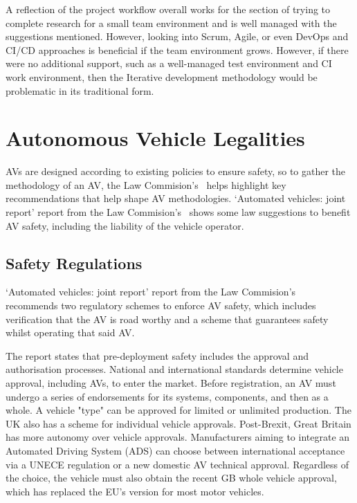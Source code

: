 \documentclass[12pt]{report} %
\begin{document}
		A reflection of the project workflow overall works for the section of trying to complete research for a small team environment and is well managed with the suggestions mentioned. However, looking into Scrum, Agile, or even DevOps and CI/CD approaches is beneficial if the team environment grows. However, if there were no additional support, such as a well-managed test environment and CI work environment, then the Iterative development methodology would be problematic in its traditional form.

\chapter{Autonomous Vehicle Legalities}
\label{chap:avLegalities}
	AVs are designed according to existing policies to ensure safety, so to gather the methodology of an AV, the Law Commision's~\cite{govuk_automated_2022} helps highlight key recommendations that help shape AV methodologies. `Automated vehicles: joint report' report from the Law Commision's~\cite{govuk_automated_2022} shows some law suggestions to benefit AV safety, including the liability of the vehicle operator.

		\section{Safety Regulations}
			`Automated vehicles: joint report' report from the Law Commision's~\cite{govuk_automated_2022} recommends two regulatory schemes to enforce AV safety, which includes verification that the AV is road worthy and a scheme that guarantees safety whilst operating that said AV.

			The report states that {pre-deployment} safety includes the approval and authorisation processes. National and international standards determine vehicle approval, including AVs, to enter the market. Before registration, an AV must undergo a series of endorsements for its systems, components, and then as a whole. A vehicle "type" can be approved for limited or unlimited production. The UK also has a scheme for individual vehicle approvals. Post-Brexit, Great Britain has more autonomy over vehicle approvals. Manufacturers aiming to integrate an Automated Driving System (ADS) can choose between international acceptance via a UNECE regulation or a new domestic AV technical approval. Regardless of the choice, the vehicle must also obtain the recent GB whole vehicle approval, which has replaced the EU's version for most motor vehicles.
\end{document}
